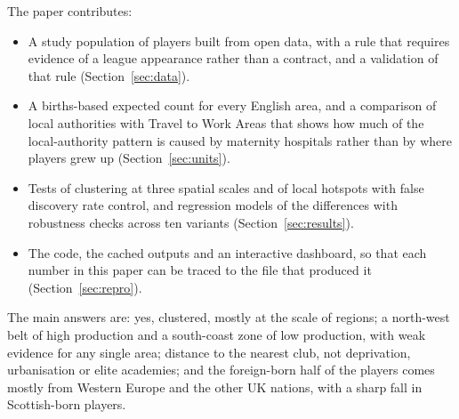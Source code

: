 \noindent The paper contributes:
\begin{itemize}
  \item A study population of \nStudy{} players built from open data, with a rule that requires evidence of a league appearance rather than a contract, and a validation of that rule (Section~\ref{sec:data}).
  \item A births-based expected count for every English area, and a comparison of local authorities with Travel to Work Areas that shows how much of the local-authority pattern is caused by maternity hospitals rather than by where players grew up (Section~\ref{sec:units}).
  \item Tests of clustering at three spatial scales and of local hotspots with false discovery rate control, and regression models of the differences with robustness checks across ten variants (Section~\ref{sec:results}).
  \item The code, the cached outputs and an interactive dashboard, so that each number in this paper can be traced to the file that produced it (Section~\ref{sec:repro}).
\end{itemize}

The main answers are: yes, clustered, mostly at the scale of regions; a north-west belt of high production and a south-coast zone of low production, with weak evidence for any single area; distance to the nearest club, not deprivation, urbanisation or elite academies; and the foreign-born half of the players comes mostly from Western Europe and the other UK nations, with a sharp fall in Scottish-born players.

